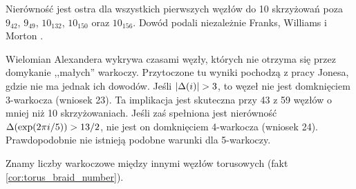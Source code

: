 Nierówność jest ostra dla wszystkich pierwszych węzłów do 10 skrzyżowań poza $9_{42}$, $9_{49}$, $10_{132}$, $10_{150}$ oraz $10_{156}$.
Dowód podali niezależnie Franks, Williams \cite{franks87} i Morton \cite{morton88}.
%
%
%

Wielomian Alexandera wykrywa czasami węzły, których nie otrzyma się przez domykanie ,,małych'' warkoczy.
%
Przytoczone tu wyniki pochodzą z pracy \cite{jones85} Jonesa, gdzie nie ma jednak ich dowodów.
Jeśli $|\Delta(i)| > 3$, to węzeł nie jest domknięciem 3-warkocza (wniosek 23).
Ta implikacja jest skuteczna przy 43 z 59 węzłów o mniej niż 10 skrzyżowaniach.
Jeśli zaś spełniona jest nierówność $\Delta (\exp (2\pi i / 5)) > 13/2$, nie jest on domknięciem 4-warkocza (wniosek 24).
Prawdopodobnie nie istnieją podobne warunki dla 5-warkoczy.

Znamy liczby warkoczowe między innymi węzłów torusowych (fakt \ref{cor:torus_braid_number}).

%


